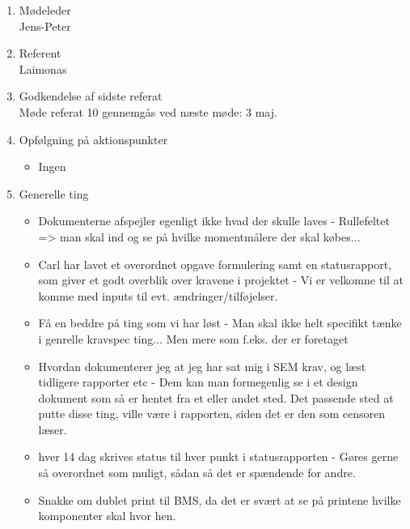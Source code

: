 	\begin{enumerate}
		\itemsep 0.3em 
		\item Mødeleder\\
			Jens-Peter
		\item Referent\\
			Laimonas
		\item Godkendelse af sidste referat\\
			Møde referat 10 gennemgås ved næste møde: 3 maj. 

		\item Opfølgning på aktionspunkter
		\begin{itemize}
			\itemsep 0.3em 
			\item Ingen
		\end{itemize}
		
		\item Generelle ting
			\begin{itemize}
					
				\item Dokumenterne afspejler egenligt ikke hvad der skulle laves - Rullefeltet => man skal ind og se på hvilke momentmålere der skal købes... 
				\item Carl har lavet et overordnet opgave formulering samt en statusrapport, som giver et godt overblik over kravene i projektet - Vi er velkomne til at komme med inputs til evt. ændringer/tilføjelser. 
				
				\item Få en beddre på ting som vi har løst - Man skal ikke helt specifikt tænke i genrelle kravspec ting... Men mere som f.eks. der er foretaget 
				
				\item Hvordan dokumenterer jeg at jeg har sat mig i SEM krav, og læst tidligere rapporter etc - Dem kan man formegenlig se i et design dokument som så er hentet fra et eller andet sted.
				Det passende sted at putte disse ting, ville være i rapporten, siden det er den som censoren læser. 
				
				\item hver 14 dag skrives status til hver punkt i statusrapporten - Gøres gerne så overordnet som muligt, sådan så det er spændende for andre. 
				
				\item Snakke om dublet print til BMS, da det er svært at se på printene hvilke komponenter skal hvor hen. 
				
			\end{itemize}
			

\end{enumerate}
